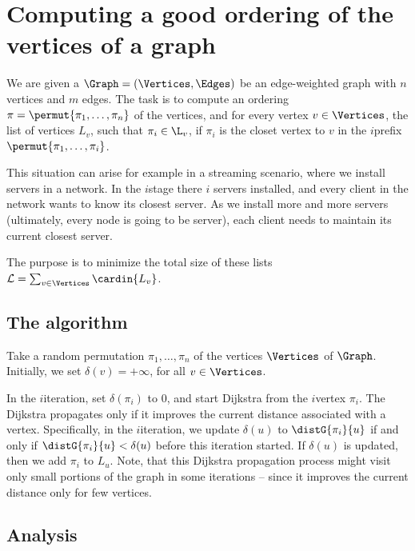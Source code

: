 
\section{Computing a good ordering of the vertices %
   of a graph}

We are given a $\Graph = (\Vertices, \Edges)$ be an edge-weighted
graph with $n$ vertices and $m$ edges. The task is to compute an
ordering $\pi = \permut{\pi_1, \ldots, \pi_n}$ of the vertices, and
for every vertex $v \in \Vertices$, the list of vertices $L_v$, such
that $\pi_i \in \L_v$, if $\pi_i$ is the closet vertex to $v$ in the
$i$\th prefix $\permut{\pi_1,\ldots, \pi_i}$.  

This situation can arise for example in a streaming scenario, where we
install servers in a network. In the $i$\th stage there $i$ servers
installed, and every client in the network wants to know its closest
server. As we install more and more servers (ultimately, every node is
going to be server), each client needs to maintain its current closest
server.

The purpose is to minimize the total size of these lists
$\mathcal{L} = \sum_{v \in \Vertices} \cardin{L_v}$.


\subsection{The algorithm}

Take a random permutation $\pi_1,\ldots, \pi_n$ of the vertices
$\Vertices$ of $\Graph$.  Initially, we set $\delta(v) = +\infty$, for
all $v \in \Vertices$.

In the $i$\th iteration, set $\delta(\pi_i)$ to $0$, and start
Dijkstra from the $i$\th vertex $\pi_i$.  The Dijkstra propagates only
if it improves the current distance associated with a
vertex. Specifically, in the $i$\th iteration, we update $\delta(u)$
to $\distG{\pi_i}{u}$ if and only if $\distG{\pi_i}{u} < \delta(u)$
before this iteration started. If $\delta(u)$ is updated, then we add
$\pi_i$ to $L_u$. Note, that this Dijkstra propagation process might
visit only small portions of the graph in some iterations -- since it
improves the current distance only for few vertices.

\subsection{Analysis}

